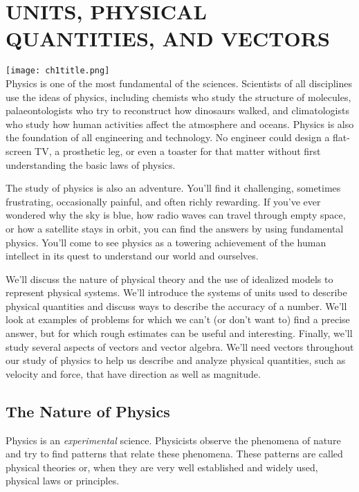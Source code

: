 
\chapter{UNITS, PHYSICAL QUANTITIES, AND VECTORS}
\label{chap:units}
\texttt{[image: ch1title.png]}\\

Physics is one of the most fundamental of the sciences. Scientists of all disciplines use the ideas of physics, including chemists who study the structure of molecules, palaeontologists who try to reconstruct how dinosaurs walked, and climatologists who study how human activities affect the atmosphere and oceans. Physics is also the foundation of all engineering and technology. No engineer could design a flat-screen TV, a prosthetic leg, or even a toaster for that matter without first understanding the basic laws of physics.

The study of physics is also an adventure. You’ll find it challenging, sometimes frustrating, occasionally painful, and often richly rewarding. If you’ve ever wondered why the sky is blue, how radio waves can travel through empty space, or how a satellite stays in orbit, you can find the answers by using fundamental physics. You’ll come to see physics as a towering achievement of the human intellect in its quest to understand our world and ourselves.

We’ll discuss the nature of physical theory and the use of idealized models to represent physical systems. We’ll introduce the systems of units used to describe physical quantities and discuss ways to describe the accuracy of a number. We’ll look at examples of problems for which we can’t (or don’t want to) find a precise answer, but for which rough estimates can be useful and interesting. Finally, we’ll study several aspects of vectors and vector algebra. We’ll need vectors throughout our study of physics to help us describe and analyze physical quantities, such as velocity and force, that have direction as well as magnitude.

\section{The Nature of Physics}
Physics is an \textit{experimental} science. Physicists observe the phenomena of nature and try to find patterns that relate these phenomena. These patterns are called physical theories or, when they are very well established and widely used, physical laws or principles.

